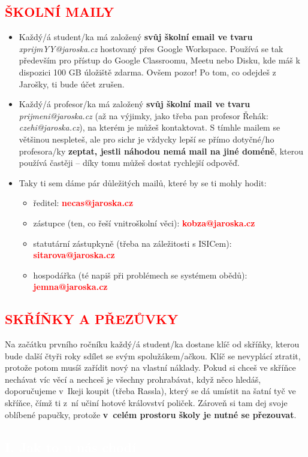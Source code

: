 \documentclass[a5paper, twoside]{article}
\newcommand{\polonadpis}[4]{
  \vspace*{-50pt}
  \begin{tcolorbox}[colback = #2, boxrule = 0pt, grow to left by = #4,  grow to right by = #4, arc=8pt, height = 30pt]
    \vspace*{5pt}
    \centering \subsection*{\textcolor{#3}{#1}}
  \end{tcolorbox}
}
\newcommand{\podnadpis}[2]{
  \subsection*{\textcolor{#2}{#1}}
}
\begin{document}
\podnadpis{ŠKOLNÍ MAILY}{red}
\begin{itemize}[leftmargin=10pt]
    \item Každý/á student/ka má založený \textbf{svůj školní email ve tvaru} \textit{xprijmYY@jaroska.cz}
    hostovaný přes Google Workspace. Používá se tak především pro přístup do Google Classroomu, Meetu
    nebo Disku, kde máš k dispozici 100 GB úložiště zdarma.
    Ovšem pozor! Po tom, co odejdeš z Jarošky, ti bude účet zrušen.
	\item Každý/á profesor/ka má založený \textbf{svůj školní mail ve tvaru} \textit{prijmeni@jaroska.cz}
	(až na výjimky, jako třeba pan profesor Řehák: \textit{czehi@jaroska.cz}), na kterém je můžeš kontaktovat.
	S tímhle mailem se většinou nespleteš, ale pro sichr je vždycky lepší se přímo dotyčné/ho
	profesora/ky \textbf{zeptat, jestli náhodou nemá mail na jiné doméně}, kterou používá častěji --
	díky tomu můžeš dostat rychlejší odpověď.
	\item  Taky ti sem dáme pár důležitých mailů, které by se ti mohly hodit:
  \begin{itemize}[leftmargin=0pt]
    \item ředitel: \textcolor{red}{\textbf{necas@jaroska.cz}}
    \item zástupce (ten, co řeší vnitroškolní věci): \textcolor{red}{\textbf{kobza@jaroska.cz}}
    \item statutární zástupkyně (třeba na záležitosti s ISICem): \textcolor{red}{\textbf{sitarova@jaroska.cz}}
    \item hospodářka (té napiš při problémech se systémem obědů): \textcolor{red}{\textbf{jemna@jaroska.cz}}
  \end{itemize}
\end{itemize}

\podnadpis{SKŘÍŇKY A PŘEZŮVKY}{red}
Na začátku prvního ročníku každý/á student/ka dostane klíč od skříňky, kterou bude další čtyři roky sdílet se svým
spolužákem/ačkou. Klíč se nevyplácí ztratit, protože potom musíš zařídit nový na vlastní náklady. Pokud si chceš ve
skříňce nechávat víc věcí a nechceš je všechny prohrabávat, když něco hledáš, doporučujeme v~Ikeji koupit 
(třeba Rassla), který se dá umístit na šatní tyč ve skříňce, čímž ti z~ní učiní hotové království poliček.
Zároveň si tam dej svoje oblíbené papučky, protože \textbf{v~celém prostoru školy je nutné se přezouvat}.

\newpage

\polonadpis{I. Jak to u nás chodí}{red}{white}{-4.1cm}
\end{document}
